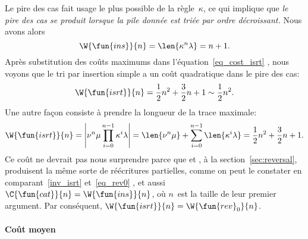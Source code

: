 Le pire des cas fait usage le plus possible de la règle~\(\kappa\), ce
qui implique que \emph{le pire des cas se produit lorsque la pile
  donnée est triée par ordre décroissant.}  Nous avons
alors
\begin{equation*}
\W{\fun{ins}}{n} = \len{\kappa^n\lambda} = n + 1.
\end{equation*}
Après substitution des coûts maximums dans
l'équation~\eqref{eq_cost_isrt} , nous voyons
que le tri par insertion simple a un coût quadratique dans le pire des
cas:
\begin{equation*}
\W{\fun{isrt}}{n} = \frac{1}{2}{n^2} + \frac{3}{2}{n} + 1
\sim \frac{1}{2}{n^2}.
\end{equation*}
Une autre façon consiste à prendre la longueur de la trace maximale:
\begin{equation*}
\W{\fun{isrt}}{n}
 = \left\lvert\nu^n\mu \prod_{i=0}^{n-1}\kappa^i\lambda\right\rvert
 = \len{\nu^n\mu} + \sum_{i=0}^{n-1}\len{\kappa^i\lambda}
 = \frac{1}{2}{n^2} + \frac{3}{2}{n} + 1.
\end{equation*}
Ce coût ne devrait pas nous surprendre parce que
 et
, à la
section~\ref{sec:reversal}, produisent la même sorte de réécritures
partielles, comme on peut le constater en comparant~\eqref{inv_isrt}
 et~\eqref{eq_rev0} , et aussi
\(\C{\fun{cat}}{n} =
\W{\fun{ins}}{n}\),
où \(n\)~est la taille de leur premier argument. Par conséquent,
\(\W{\fun{isrt}}{n} = \W{\fun{rev}_0}{n}\).

\paragraph{Coût moyen}
\label{par:ave_isrt}

